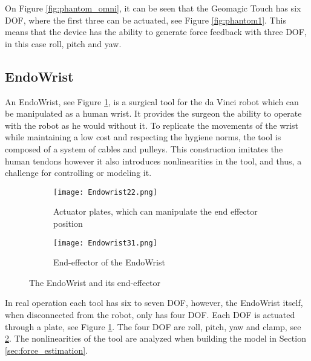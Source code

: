 On Figure \ref{fig:phantom_omni}, it can be seen that the Geomagic Touch has six DOF, where the first three can be actuated, see Figure \ref{fig:phantom1}. This means that the device has the ability to generate force feedback with three DOF, in this case roll, pitch and yaw.



    
\subsection{EndoWrist}\label{sec:EndoWrist}

{\color{green}An EndoWrist, see Figure \ref{fig:Endo_plates}, is a surgical tool for the da Vinci robot which can be manipulated as a human wrist. It provides the surgeon the ability to operate with the robot as he would without it. To replicate the movements of the wrist while maintaining a low cost and respecting the hygiene norms, the tool is composed of a system of cables and pulleys. This construction imitates the human tendons however it also introduces nonlinearities in the tool, and thus, a challenge for controlling or modeling it.

\begin{figure}[h]
  \centering
  \begin{subfigure}{.22\textwidth}
    \centering
    \texttt{[image: Endowrist22.png]}
    \caption{Actuator plates, which can manipulate the end effector position}
    \label{fig:Endo_plates}
  \end{subfigure}
  \begin{subfigure}{.22\textwidth}
    \centering
    \texttt{[image: Endowrist31.png]}
    \caption{End-effector of the EndoWrist\newline}
    \label{fig:Endo_end}
  \end{subfigure}
\caption{The EndoWrist and its end-effector}
\label{fig:endowrits_set}
\end{figure}

In real operation each tool has six to seven DOF, however, the EndoWrist itself, when disconnected from the robot, only has four DOF. Each DOF is actuated through a plate, see Figure \ref{fig:Endo_plates}. The four DOF are roll, pitch, yaw and clamp, see \ref{fig:Endo_end}. The nonlinearities of the tool are analyzed when building the model in Section \ref{sec:force_estimation}.
}

